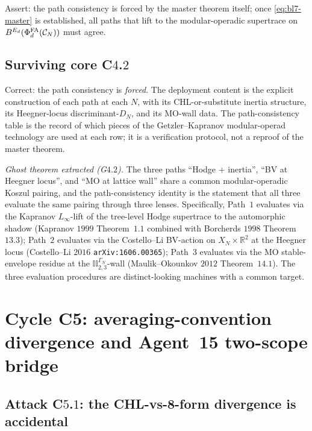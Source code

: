 Assert: the path consistency is forced by the master theorem itself;
once \eqref{eq:bl7-master} is established, all paths that lift to the
modular-operadic supertrace on $B^{E_{d}}(\Phi^{\mathrm{FA}}_d(\mathcal{C}_N))$ must agree.

\subsection*{Surviving core C$4$.$2$}

Correct: the path consistency is \emph{forced}. The deployment content
is the explicit construction of each path at each $N$, with its
CHL-or-substitute inertia structure, its Heegner-locus
discriminant-$D_N$, and its MO-wall data. The path-consistency table
is the record of which pieces of the Getzler--Kapranov modular-operad
technology are used at each row; it is a verification protocol, not a
reproof of the master theorem.

\emph{Ghost theorem extracted (G$4$.$2$).} The three paths ``Hodge +
inertia'', ``BV at Heegner locus'', and ``MO at lattice wall'' share a
common modular-operadic Koszul pairing, and the path-consistency
identity is the statement that all three evaluate the same pairing
through three lenses. Specifically, Path~$1$ evaluates via the Kapranov
$L_\infty$-lift of the tree-level Hodge supertrace to the automorphic
shadow (Kapranov $1999$ Theorem~$1.1$ combined with Borcherds $1998$
Theorem~$13.3$); Path~$2$ evaluates via the Costello--Li BV-action on
$X_N \times \mathbb{R}^2$ at the Heegner locus (Costello--Li $2016$
\texttt{arXiv:1606.00365}); Path~$3$ evaluates via the MO stable-envelope
residue at the $\mathbb{II}_{2, 3}^{\Gamma_N}$-wall (Maulik--Okounkov
$2012$ Theorem~$14.1$). The three evaluation procedures are
distinct-looking machines with a common target.

\section{Cycle C5: averaging-convention divergence and Agent~15 two-scope
bridge}
\label{sec:cycle-c5-averaging-convention}

\subsection*{Attack C$5$.$1$: the CHL-vs-8-form divergence is accidental}

